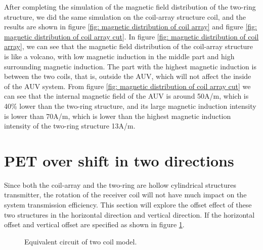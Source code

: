 After completing the simulation of the magnetic field distribution of the two-ring structure, we did the same simulation on the coil-array structure coil, and the results are shown in figure \ref{fig: magnetic distribution of coil array} and figure \ref{fig: magnetic distribution of coil array cut}.
In figure \ref{fig: magnetic distribution of coil array}, we can see that the magnetic field distribution of the coil-array structure is like a volcano, with low magnetic induction in the middle part and high surrounding magnetic induction. The part with the highest magnetic induction is between the two coils, that is, outside the AUV, which will not affect the inside of the AUV system. From figure \ref{fig: magnetic distribution of coil array cut} we can see that the internal magnetic field of the AUV is around 50A/m, which is 40\% lower than the two-ring structure, and its large magnetic induction intensity is lower than 70A/m, which is lower than the highest magnetic induction intensity of the two-ring structure 13A/m.


\section{PET over shift in two directions}

Since both the coil-array and the two-ring are hollow cylindrical structures transmitter, the rotation of the receiver coil will not have much impact on the system transmission efficiency. This section will explore the offset effect of these two structures in the horizontal direction and vertical direction.
If the horizontal offset and vertical offset are specified as shown in figure \ref{fig: direction}.

\begin{figure}[!t]
    \centering
    \caption{Equivalent circuit of two coil model.}
    \label{fig: direction}
\end{figure}

